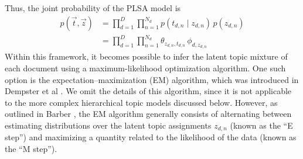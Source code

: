 \documentclass{article}
\begin{document}
Thus, the joint probability of the PLSA model is
\begin{align}
p(\vec{t}, \vec{z})
&= \prod_{d=1}^D \prod_{n=1}^{N_d} p(t_{d,n} \mid z_{d,n}) \, p(z_{d,n}) \\
&= \prod_{d=1}^D \prod_{n=1}^{N_d} \theta_{z_{d,n}, t_{d,n}} \, \phi_{d, z_{d,n}}
\end{align}
Within this framework, it becomes possible to infer the latent topic mixture of each document using a maximum-likelihood optimization algorithm.
One such option is the expectation--maximization (EM) algorithm, which was introduced in Dempster et al \cite{dempster1977em}.
We omit the details of this algorithm, since it is not applicable to the more complex hierarchical topic models discussed below.
However, as outlined in Barber \cite{barber2012bayesian}, the EM algorithm generally consists of alternating between estimating distributions over the latent topic assignments $z_{d,n}$ (known as the ``E step'') and maximizing a quantity related to the likelihood of the data (known as the ``M step'').

\end{document}
